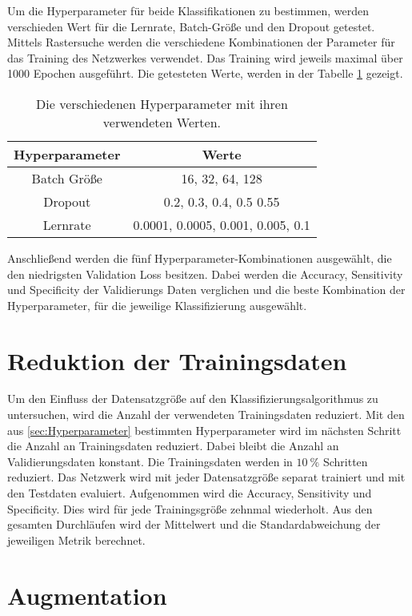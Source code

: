Um die Hyperparameter für beide Klassifikationen zu bestimmen, werden verschieden Wert für die
Lernrate, Batch-Größe und den Dropout getestet.
Mittels Rastersuche werden die verschiedene Kombinationen der Parameter für das Training des Netzwerkes verwendet. 
Das Training wird jeweils maximal über 1000 Epochen ausgeführt.
Die getesteten Werte, werden in der Tabelle \ref{tab:Hypp} gezeigt.

\begin{table}[htbp]
    \centering
    \begin{tabular}{c c}
        \toprule
        Hyperparameter     & Werte \\
        \midrule
        Batch Größe    & 16, 32, 64, 128   \\
        Dropout        & 0.2, 0.3, 0.4, 0.5 0.55   \\
        Lernrate       & 0.0001, 0.0005, 0.001, 0.005, 0.1   \\
        \bottomrule
  \end{tabular}
  \caption{Die verschiedenen Hyperparameter mit ihren verwendeten Werten.}
  \label{tab:Hypp}
\end{table}
Anschließend werden die fünf Hyperparameter-Kombinationen ausgewählt, die den niedrigsten Validation Loss besitzen.
Dabei werden die Accuracy, Sensitivity und Specificity der Validierungs Daten verglichen und die beste Kombination der Hyperparameter, 
für die jeweilige Klassifizierung ausgewählt.  

\section{Reduktion der Trainingsdaten}\label{sec:Red1}
Um den Einfluss der Datensatzgröße auf den Klassifizierungsalgorithmus zu untersuchen, wird die Anzahl der verwendeten Trainingsdaten reduziert.
Mit den aus \ref{sec:Hyperparameter} bestimmten Hyperparameter wird im nächsten Schritt die Anzahl an Trainingsdaten reduziert.
Dabei bleibt die Anzahl an Validierungsdaten konstant.
Die Trainingsdaten werden in $\qty{10}{\%}$ Schritten reduziert. 
Das Netzwerk wird mit jeder Datensatzgröße separat trainiert und mit den Testdaten evaluiert. 
Aufgenommen wird die Accuracy, Sensitivity und Specificity.
Dies wird für jede Trainingsgröße zehnmal wiederholt.
Aus den gesamten Durchläufen wird der Mittelwert und die Standardabweichung der jeweiligen Metrik berechnet.

\section{Augmentation}

